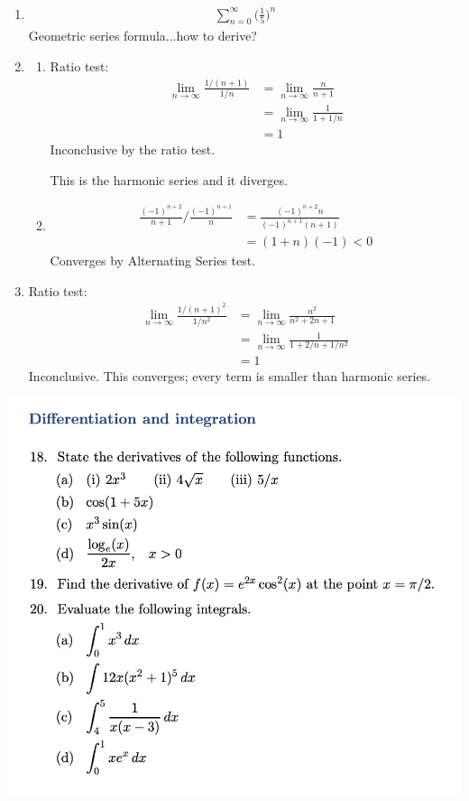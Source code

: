 \begin{enumerate}
\item \begin{align*}
    \sum_{n=0}^\infty \Big(\frac{1}{5}\Big)^n
  \end{align*}
  Geometric series formula...how to derive?
\item
  \begin{enumerate}[item=(\alph*)]
  \item Ratio test:
    \begin{align*}
      \lim_{n\to\infty} \frac{1/(n+1)}{1/n}
      &= \lim_{n\to\infty} \frac{n}{n+1} \\
      &= \lim_{n\to\infty} \frac{1}{1 + 1/n} \\
      &= 1
    \end{align*}
    Inconclusive by the ratio test.

    This is the harmonic series and it diverges.
  \item \begin{align*}
      \frac{(-1)^{n+2}}{n+1} / \frac{(-1)^{n+1}}{n}
      &= \frac{(-1)^{n+2}n}{(-1)^{n+1}(n+1)} \\
      &= (1 + n)(-1) < 0
    \end{align*}
    Converges by Alternating Series test.
  \end{enumerate}
\item Ratio test:
  \begin{align*}
      \lim_{n\to\infty} \frac{1/(n+1)^2}{1/n^2}
      &= \lim_{n\to\infty} \frac{n^2}{n^2 + 2n + 1} \\
      &= \lim_{n\to\infty} \frac{1}{1 + 2/n + 1/n^2} \\
      &= 1
    \end{align*}
    Inconclusive. This converges; every term is smaller than harmonic series.

\end{enumerate}


\includegraphics[width=400pt]{img/ou-entry-a82d.png}




